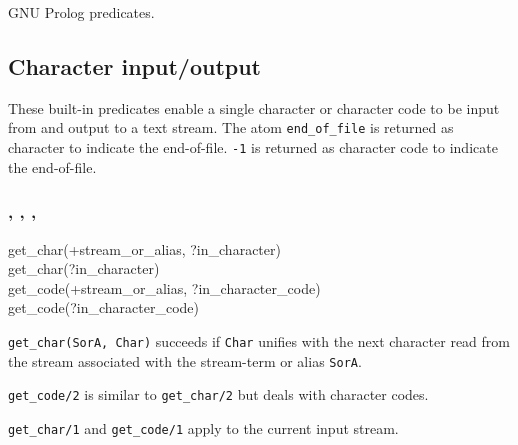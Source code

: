 \Portability

GNU Prolog predicates.

\subsection{Character input/output}
These built-in predicates enable a single character or character code to be
input from and output to a text stream. The atom \texttt{end\_of\_file} is
returned as character to indicate the end-of-file. \texttt{-1} is returned
as character code to indicate the end-of-file.

\subsubsection{,\label{get-char/2}
               ,
               ,
               }


\begin{TemplatesOneCol}
get\_char(+stream\_or\_alias, ?in\_character)\\
get\_char(?in\_character)\\
get\_code(+stream\_or\_alias, ?in\_character\_code)\\
get\_code(?in\_character\_code)

\end{TemplatesOneCol}

\Description

\texttt{get\_char(SorA, Char)} succeeds if \texttt{Char} unifies with the
next character read from the stream associated with the stream-term or alias
\texttt{SorA}.

\texttt{get\_code/2} is similar to \texttt{get\_char/2} but deals with
character codes.

\texttt{get\_char/1} and \texttt{get\_code/1} apply to the current input
stream.

